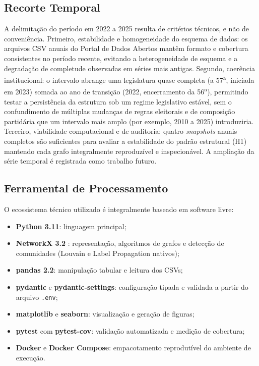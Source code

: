 \documentclass[
      12pt,
      a4paper,
      openright,
      oneside,
      chapter=TITLE,
      section=TITLE,
      english,
      french,
      spanish,
      brazilian
    ]{abntex2}
\begin{document}
    \subsection{Recorte Temporal}
    
    A delimitação do período em 2022 a 2025 resulta de critérios técnicos, e não de conveniência. Primeiro, estabilidade e homogeneidade do esquema de dados: os arquivos CSV anuais do Portal de Dados Abertos mantêm formato e cobertura consistentes no período recente, evitando a heterogeneidade de esquema e a degradação de completude observadas em séries mais antigas. Segundo, coerência institucional: o intervalo abrange uma legislatura quase completa (a 57\textsuperscript{a}, iniciada em 2023) somada ao ano de transição (2022, encerramento da 56\textsuperscript{a}), permitindo testar a persistência da estrutura sob um regime legislativo estável, sem o confundimento de múltiplas mudanças de regras eleitorais e de composição partidária que um intervalo mais amplo (por exemplo, 2010 a 2025) introduziria. Terceiro, viabilidade computacional e de auditoria: quatro \textit{snapshots} anuais completos são suficientes para avaliar a estabilidade do padrão estrutural (H1) mantendo cada grafo integralmente reproduzível e inspecionável. A ampliação da série temporal é registrada como trabalho futuro.
    
    
    
    \subsection{Ferramental de Processamento}
    
    O ecossistema técnico utilizado é integralmente baseado em software livre:
    
    \begin{itemize}
        \item \textbf{Python 3.11}: linguagem principal;
        \item \textbf{NetworkX 3.2} \cite
        {networkx}: representação, algoritmos de grafos e detecção de comunidades (Louvain e Label Propagation nativos);
        \item \textbf{pandas 2.2}: manipulação tabular e leitura dos CSVs;
        \item \textbf{pydantic} e \textbf{pydantic-settings}: configuração tipada e validada a partir do arquivo \texttt{.env};
        \item \textbf{matplotlib} e \textbf{seaborn}: visualização e geração de figuras;
        \item \textbf{pytest} com \textbf{pytest-cov}: validação automatizada e medição de cobertura;
        \item \textbf{Docker} e \textbf{Docker Compose}: empacotamento reprodutível do ambiente de execução.
    \end{itemize}
    
\end{document}
